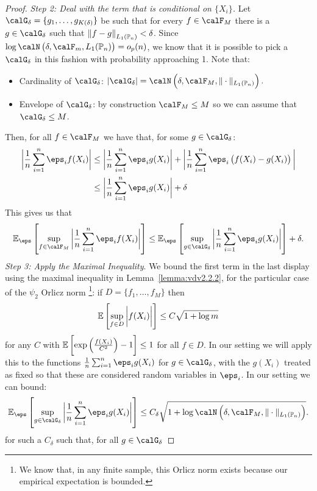 \begin{proof}
	\textit{Step 2: Deal with the term that is conditional on \(\{X_i\}\).} Let \(\calG_\delta = \{g_1,\dots,g_{K(\delta)}\}\) be such that for every \(f\in\calF_M\) there is a  \(g \in \calG_\delta\) such that \(\left\|f-g\right\|_{L_1(\P_n)}<\delta\). Since \(\log\calN\left(\delta,\calF_m,L_1(\P_n)\right)=o_p(n)\), we know that it is possible to pick a \(\calG_\delta\) in this fashion with probability approaching 1. Note that:
	\begin{itemize}
		\item Cardinality of \(\calG_\delta\): \(\left|\calG_\delta\right| = \calN\left(\delta,\calF_M,\|\cdot\|_{L_1(\P_n)}\right).\)
		\item Envelope of \(\calG_\delta\): by construction \(\calF_M \leq M\) so we can assume that \(\calG_\delta\leq M\).
	\end{itemize}
	Then, for all \(f\in\calF_M\) we have that, for some  \(g\in\calG_\delta\):
	\begin{align*}
		\bigg|\frac{1}{n}\sum_{i=1}^n \eps_if(X_i)\bigg|
		&\leq \bigg|\frac{1}{n}\sum_{i=1}^n \eps_ig(X_i)\bigg| + \bigg|\frac{1}{n}\sum_{i=1}^n \eps_i\left(f(X_i) - g(X_i)\right)\bigg| \\
		&\leq \bigg|\frac{1}{n}\sum_{i=1}^n \eps_ig(X_i)\bigg|+\delta 
	\end{align*}
	This gives us that
	\[
		\E_\eps\left[\sup_{f\in\calF_M}\bigg|\frac{1}{n}\sum_{i=1}^n \eps_if(X_i)\bigg|\right] \leq \E_\eps\left[\sup_{g\in\calG_\delta}\bigg|\frac{1}{n}\sum_{i=1}^n \eps_ig(X_i)\bigg|\right]+\delta
	.\]
	\textit{Step 3: Apply the Maximal Inequality}. We bound the first term in the last display using the maximal inequality in Lemma~\ref{lemma:vdv2.2.2}, for the particular case of the \(\psi_2\) Orlicz norm \footnote{We know that, in any finite sample, this Orlicz norm exists because our empirical expectation is bounded.}: if \(D = \{f_1,\dots,f_M\}\) then 
	\[\E\left[\sup_{f\in D}\bigg|f(X_i)\bigg|\right] \leq C\sqrt{1+\log m}\]
	for any \(C\) with  \(\E\left[\exp\left(\frac{f(X_i)}{C^2}\right)-1\right]\leq 1\) for all \(f\in D\). In our setting we will apply this to the functions \(\frac{1}{n}\sum_{i=1}^n \eps_i g(X_i)\) for \(g\in\calG_\delta\), with the \(g(X_i)\) treated as fixed so that  these are considered random variables in \(\eps_i\). In our setting we can bound:
	\[
		\E_\eps\left[\sup_{g\in\calG_\delta}\bigg|\frac{1}{n}\sum_{i=1}^n \eps_ig(X_i)\bigg|\right] \leq C_\delta \sqrt{1 + \log\calN\left(\delta,\calF_M,\|\cdot\|_{L_1(\P_n)}\right)}
	.\] 
	for such a \(C_\delta\) such that, for all \(g \in \calG_\delta\)

\end{proof}
